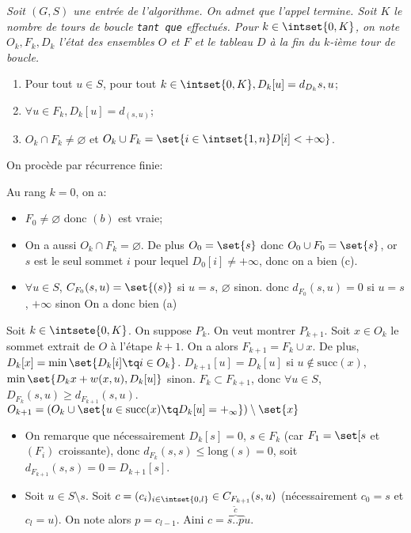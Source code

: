 \documentclass{scrartcl}
\begin{document}
			 \textsl{Soit $(G,S)$ une entrée de l'algorithme. On admet que l'appel termine. 
			Soit $K$ le nombre de tours de boucle \texttt{tant que} effectués.
			Pour $k \in \intset{0,K}$, on note $O_k, F_k, D_k$ l'état des ensembles $O$ et $F$ et le tableau $D$ à la fin du $k$-ième tour de boucle.}
			\begin{enumerate}[label=(\alph*)]
				\item Pour tout $u \in S$, pour tout $k \in \intset{0,K}, D_k[u] = d_{D_k}{s,u}$;
				\item $\forall u \in F_k, D_k[u] = d_(s,u)$;
				\item $O_k \cap F_k \neq \varnothing$ et $O_k\cup F_k = \set{i \in \intset{1,n} D[i] < +\infty}$.
			\end{enumerate}

			\begin{demo}
				\item On procède par récurrence finie:
				\item Au rang $k=0$, on a:
				\begin{itemize}
					\item $F_0 \neq \varnothing$ donc $(b)$ est vraie;
					\item On a aussi $O_k \cap F_k = \varnothing$.
					De plus $O_0 = \set{s}$ donc $O_0\cup F_0 = \set{s}$, 
					or $s$ est le seul sommet $i$ pour lequel $D_0[i] \neq +\infty$, donc on a bien (c).
					\item $\forall u \in S$, $C_{F_0}(s,u) = \set{(s)}$ si $u=s$, $\varnothing$ sinon.
					donc $d_{F_0}(s,u) = 0$ si $u = s$, $+\infty$ sinon
					On a donc bien (a)
				\end{itemize}
				\item Soit $k \in \intsete{0,K}$. On suppose $P_k$. On veut montrer $P_{k+1}$.
				Soit $x \in O_k$ le sommet extrait de $O$ à l'étape $k+1$.
				On a alors $F_{k+1} = F_k \cup {x}$.
				De plus, $D_k[x] = \min\set{D_k[i] \tq i \in O_k}$.
				$D_{k+1}[u] = D_k[u]$ si $u \not\in\text{succ}(x)$, $\min\set{D_k{x} + w(x,u),D_k[u]}$ sinon.
				$F_k \subset F_{k+1}$, donc $\forall u \in S$, $D_{F_k}(s,u) \geq d_{F_{k+1}}(s,u)$.
				$O_{k+1} = (O_k \cup \set{u \in \text{succ}(x) \tq D_k[u] = +_\infty})\setminus\set{x}$
				\begin{itemize}
					\item On remarque que nécessairement $D_k[s] = 0$, $s \in F_k$ (car $F_1 = \set[{s}$ et $(F_i)$ croissante), donc $d_{F_k}(s,s) \leq \text{long}(s) = 0$,
					soit $d_{F_{k+1}}(s,s) = 0 = D_{k+1}[s]$.
					\item Soit $u \in S \setminus{s}$.
					Soit $c = (c_i)_{i \in \intset{0,l}}\in C_{F_{k+1}}(s,u)$ (nécessairement $c_0 = s$ et $c_l = u$).
					On note alors $p = c_{l-1}$. Aini $c = \overbrace{s..p}^{\widetilde{c}} u$.


\end{itemize}
\end{demo}
\end{document}
